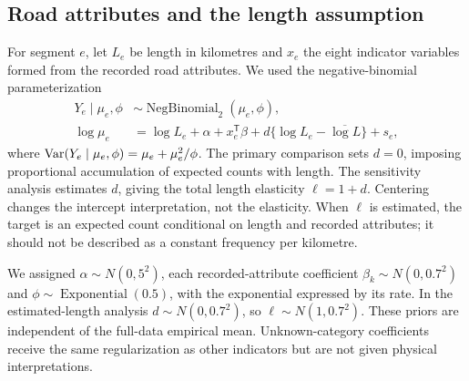 \documentclass[11pt]{article}
\begin{document}
\subsection{Road attributes and the length assumption}
For segment $e$, let $L_e$ be length in kilometres and $x_e$ the eight indicator variables formed from the recorded road attributes. We used the negative-binomial parameterization
\begin{align}
 Y_e\mid\mu_e,\phi&\sim\operatorname{NegBinomial}_2(\mu_e,\phi),\\
 \log\mu_e&=\log L_e+\alpha+x_e^{\mathsf T}\beta
      +d\{\log L_e-\overline{\log L}\}+s_e,
 \label{eq:count}
\end{align}
where $\operatorname{Var}(Y_e\mid\mu_e,\phi)=\mu_e+\mu_e^2/\phi$. The primary comparison sets $d=0$, imposing proportional accumulation of expected counts with length. The sensitivity analysis estimates $d$, giving the total length elasticity $\ell=1+d$. Centering changes the intercept interpretation, not the elasticity. When $\ell$ is estimated, the target is an expected count conditional on length and recorded attributes; it should not be described as a constant frequency per kilometre.

We assigned $\alpha\sim N(0,5^2)$, each recorded-attribute coefficient $\beta_k\sim N(0,0.7^2)$ and $\phi\sim\operatorname{Exponential}(0.5)$, with the exponential expressed by its rate. In the estimated-length analysis $d\sim N(0,0.7^2)$, so $\ell\sim N(1,0.7^2)$. These priors are independent of the full-data empirical mean. Unknown-category coefficients receive the same regularization as other indicators but are not given physical interpretations.
\end{document}
